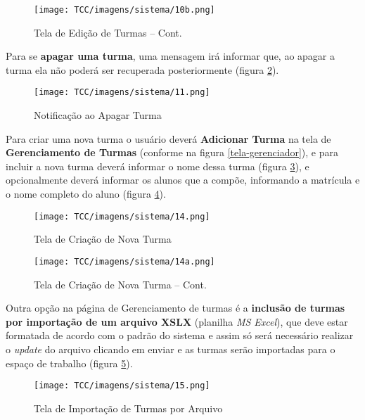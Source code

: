 \begin{anexosenv}
\begin{figure}[H]
     \centering
     \texttt{[image: TCC/imagens/sistema/10b.png]}
     \caption{Tela de Edição de Turmas -- Cont.}
     \label{tela-edit-2}
\end{figure}

Para se \textbf{apagar uma turma}, uma mensagem irá informar que, ao apagar a turma ela não poderá ser recuperada posteriormente (figura \ref{tela-delete}).

\begin{figure}[H]
     \centering
     \texttt{[image: TCC/imagens/sistema/11.png]}
     \caption{Notificação ao Apagar Turma}
     \label{tela-delete}
\end{figure}

Para criar uma nova turma o usuário deverá \textbf{Adicionar Turma} na tela de \textbf{Gerenciamento de Turmas} (conforme na figura \ref{tela-gerenciador}), e para incluir a nova turma deverá informar o nome dessa turma (figura \ref{tela-create}), e opcionalmente deverá informar os alunos que a compõe, informando a matrícula e o nome completo do aluno (figura \ref{tela-create-2}).
\begin{figure}[H]
     \centering
     \texttt{[image: TCC/imagens/sistema/14.png]}
     \caption{Tela de Criação de Nova Turma}
     \label{tela-create}
\end{figure}

\begin{figure}[H]
     \centering
     \texttt{[image: TCC/imagens/sistema/14a.png]}
     \caption{Tela de Criação de Nova Turma -- Cont.}
     \label{tela-create-2}
\end{figure}

Outra opção na página de Gerenciamento de turmas é a \textbf{inclusão de turmas por importação de um arquivo XSLX} (planilha \textit{MS Excel}), que deve estar formatada de acordo com o padrão do sistema e assim só será necessário realizar o \textit{update} do arquivo clicando em enviar e as turmas serão importadas para o espaço de trabalho (figura \ref{tela-import}).

\begin{figure}[H]
     \centering
     \texttt{[image: TCC/imagens/sistema/15.png]}
     \caption{Tela de Importação de Turmas por Arquivo}
     \label{tela-import}
\end{figure}


\end{anexosenv}
